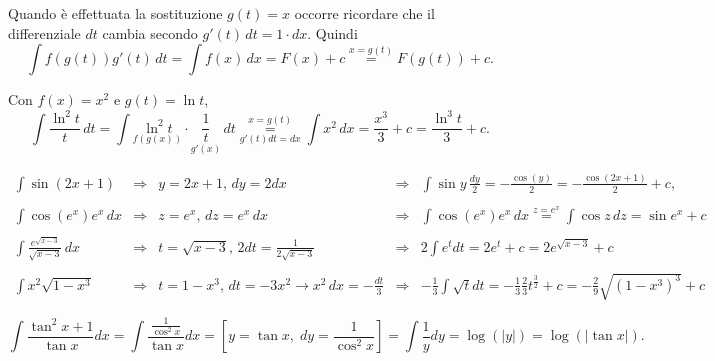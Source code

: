 Quando è effettuata la sostituzione $g(t)=x$ occorre ricordare che il differenziale $dt$ cambia secondo $g'(t)\, dt = 1\cdot dx$. Quindi
\begin{equation*}
        \int f(g(t))g'(t)\, dt = \int f(x)\, dx = F(x) + c \overset{x=g(t)}{=}F(g(t)) + c.
\end{equation*}

\begin{example}
    Con $f(x)=x^2$ e $g(t)=\ln t$,
    \begin{equation*}
        \int\frac{\ln^2t}{t}\,dt= \int\underset{f(g(x))}{\ln^2 t}\cdot\underset{g'(x)}{\frac{1}{t}}\, dt \underset{g'(t)dt=dx}{\overset{x=g(t)}{=}}\int x^2\, dx = \frac{x^3}{3}+c = \frac{\ln^3 t}{3}+c.
    \end{equation*}
\end{example}

\begin{example}
    \begin{equation*}
        \begin{matrix}
            \int\sin(2x+1)&\Rightarrow
            & y=2x+1,\, dy=2dx &\Rightarrow&\int\sin y\, \frac{dy}{2}=-\frac{\cos(y)}{2}=-\frac{\cos(2x+1)}{2}+c,\\\\
            \int \cos(e^x)e^x\,dx &\Rightarrow & z=e^x,\, dz=e^x\, dx &\Rightarrow& \int\cos(e^x) e^x\, dx \overset{z=e^x}{=}\int\cos z\, dz= \sin e^x+c\\\\
            \int\frac{e^{\sqrt{x-3}}}{\sqrt{x-3}}\, dx &\Rightarrow& t=\sqrt{x-3},\, 2dt=\frac{1}{2\sqrt{x-3}} &\Rightarrow& 2 \int e^t dt =  2 e^t+c = 2e^{\sqrt{x-3}} + c\\\\
            \int x^2\sqrt{1-x^3} &\Rightarrow& t = 1-x^3,\, dt=-3x^2\rightarrow x^2\, dx= -\frac{dt}{3} &\Rightarrow& -\frac{1}{3}\int\sqrt{t} dt = -\frac{1}{3}\frac{2}{3}t^{\frac{3}{2}}+c =  -\frac{2}{9}\sqrt{(1-x^3)^3}+ c
        \end{matrix}
    \end{equation*}
\end{example}

\begin{example}
    \begin{equation*}
        \int\frac{\tan^2x+1}{\tan x}dx = \int \frac{\frac{1}{\cos^2x}}{\tan x} dx = \left[y = \tan x,\; dy = \frac{1}{\cos^2x} \right] = \int \frac{1}{y}dy = \log(|y|) = \log(|\tan x|).
    \end{equation*}
\end{example}

